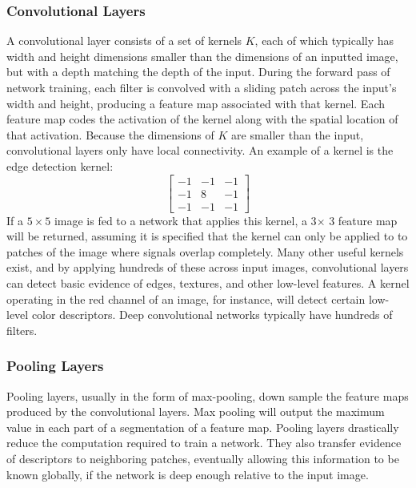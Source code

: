 \subsubsection{Convolutional Layers}
A convolutional layer consists of a set of kernels $K$, each of which typically has width and height dimensions smaller than the dimensions of an inputted image, but with a depth matching the depth of the input. During the forward pass of network training, each filter is convolved with a sliding patch across the input's width and height, producing a feature map associated with that kernel. Each feature map codes the activation of the kernel along with the spatial location of that activation. Because the dimensions of $K$ are smaller than the input, convolutional layers only have local connectivity. An example of a kernel is the edge detection kernel:
\[
\begin{bmatrix}
	-1 & -1 & -1\\
	-1 & 8 & -1\\
	-1 & -1 & -1
\end{bmatrix}
\]
If a $5\times 5$ image is fed to a network that applies this kernel, a 3$\times$ 3 feature map will be returned, assuming it is specified that the kernel can only be applied to to patches of the image where signals overlap completely. Many other useful kernels exist, and by applying hundreds of these across input images, convolutional layers can detect basic evidence of edges, textures, and other low-level features. A kernel operating in the red channel of an image, for instance, will detect certain low-level color descriptors. Deep convolutional networks typically have hundreds of filters.

\subsubsection{Pooling Layers}
Pooling layers, usually in the form of max-pooling, down sample the feature maps produced by the convolutional layers. Max pooling will output the maximum value in each part of a segmentation of a feature map. Pooling layers drastically reduce the computation required to train a network. They also transfer evidence of descriptors to neighboring patches, eventually allowing this information to be known globally, if the network is deep enough relative to the input image.

